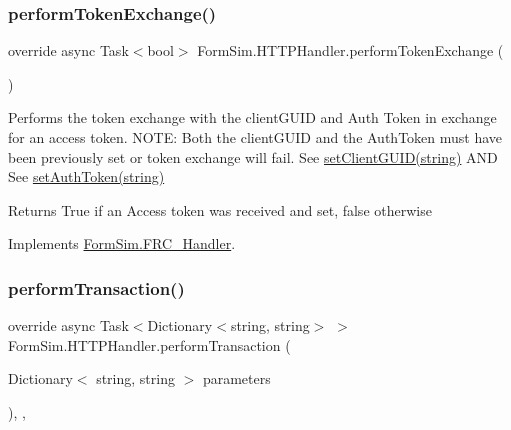 \subsubsection{\texorpdfstring{perform\+Token\+Exchange()}{performTokenExchange()}}
{\footnotesize\ttfamily override async Task$<$bool$>$ Form\+Sim.\+H\+T\+T\+P\+Handler.\+perform\+Token\+Exchange (\begin{DoxyParamCaption}{ }\end{DoxyParamCaption})\hspace{0.3cm}{\ttfamily [inline]}}



Performs the token exchange with the client\+G\+U\+ID and Auth Token in exchange for an access token. N\+O\+TE\+: Both the client\+G\+U\+ID and the Auth\+Token must have been previously set or token exchange will fail. See \mbox{\hyperlink{interface_form_sim_1_1_f_r_c___handler_a3c77b2e99c98553928e463a9cbb5f7d4}{set\+Client\+G\+U\+I\+D(string)}} A\+ND See \mbox{\hyperlink{interface_form_sim_1_1_f_r_c___handler_a1314ea0937067435e3326818baa9d0c1}{set\+Auth\+Token(string)}} 

\begin{DoxyReturn}{Returns}
True if an Access token was received and set, false otherwise
\end{DoxyReturn}


Implements \mbox{\hyperlink{interface_form_sim_1_1_f_r_c___handler_a32c299d3cb3cdd6c444e76b3671af1b4}{Form\+Sim.\+F\+R\+C\+\_\+\+Handler}}.

\mbox{\label{class_form_sim_1_1_h_t_t_p_handler_a1b87e232c94cf390f7a9656744006639}} 
\subsubsection{\texorpdfstring{perform\+Transaction()}{performTransaction()}}
{\footnotesize\ttfamily override async Task$<$Dictionary$<$string, string$>$ $>$ Form\+Sim.\+H\+T\+T\+P\+Handler.\+perform\+Transaction (\begin{DoxyParamCaption}\item[{Dictionary$<$ string, string $>$}]{parameters }\end{DoxyParamCaption})\hspace{0.3cm}{\ttfamily [inline]}, {\ttfamily [protected]}, {\ttfamily [virtual]}}



